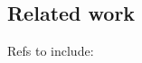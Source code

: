 \documentclass[11pt, oneside]{article}   	%
\begin{document}
%




\subsection{Related work}

Refs to include:
\cite{ClaytonScott,AndrewY.Ng,SamT.Roweis,EricP.Xing,SujaySanghavi,BiancaZadrozny,Zadrozny2001,TommiJaakkola}
\end{document}
